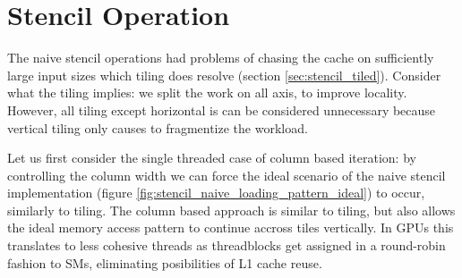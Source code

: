 \section{Stencil Operation}

The naive stencil operations had problems of chasing the cache on sufficiently large input sizes which tiling does resolve (section \ref{sec:stencil_tiled}).
Consider what the tiling implies: we split the work on all axis, to improve locality.
However, all tiling except horizontal is can be considered unnecessary because vertical tiling only causes to fragmentize the workload.

Let us first consider the single threaded case of column based iteration: by controlling the column width we can force the ideal scenario of the naive stencil implementation (figure \ref{fig:stencil_naive_loading_pattern_ideal}) to occur, similarly to tiling.
The column based approach is similar to tiling, but also allows the ideal memory access pattern to continue accross tiles vertically.
In GPUs this translates to less cohesive threads as threadblocks get assigned in a round-robin fashion to SMs, eliminating posibilities of L1 cache reuse.

